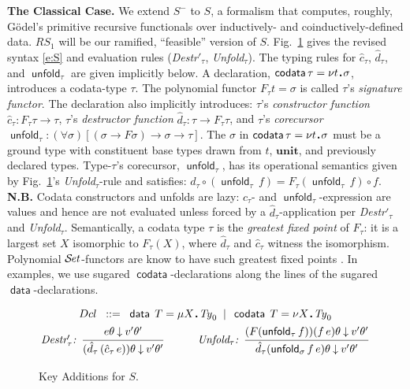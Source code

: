 \documentclass[envcountsame]{llncs}
\newcommand{\co}[1]{\hat{#1}}
\newcommand{\key}[1]{\ensuremath{\mathop{\mathsf{#1}}\nolimits}\xspace}
\newcommand{\unfold}{\key{unfold}}
\newcommand{\Unit}{\ensuremath{\mathbf{unit}}\xspace}
\newcommand{\Ty}{\mathit{Ty}}
\newcommand{\constr}[1]{\ensuremath{\mathop{\mathsf{#1}}\nolimits}\xspace}
\newcommand{\data}{\constr{data}}
\newcommand{\codata}{\constr{codata}}
\newcommand{\lfp}[1]{\mu #1\,\sqdot\,}
\newcommand{\gfp}[1]{\nu #1\,\sqdot\,}
\newcommand{\SetCat}{\ensuremath{\mathcal{S}\mkern-2.5mu\mathit{et}}\xspace}
\newcommand{\RSi}{\mathit{RS_1}}
\newcommand{\sqdot}{\rule{0.5mm}{0.5mm}}
\newcommand{\is}{\ensuremath{\mathrel{\mathrel{:}\mathrel{:}=}}}
\newcommand{\synsep}{\;\;|\;\;}
\newcommand{\yields}{\mathbin{\downarrow}}
\newcommand{\of}{\colon}
\renewcommand{\colon}{\mathpunct{:}}
\newcommand{\Quad}[1]{\hspace*{#1em}}
\newcommand{\irule}[2]{\ensuremath{{\frac{\strut\textstyle #1}{\strut\textstyle #2}}}}
\newcommand{\rulelabel}[1]{\hbox{\it #1:}\Quad{0.5}}
\begin{document}
\textbf{The Classical Case.} \enspace We extend $S^-$ to $S$, a
formalism that computes, roughly, G\"{o}del's primitive recursive
functionals over inductively- and coinductively-defined data.
$\RSi$ will be our ramified, ``feasible'' version of $S$.
Fig.~\ref{fig:S} gives the revised syntax \eqref{e:S} and evaluation
rules (\emph{Destr}$'_\tau$, \emph{Unfold$_\tau$}).  The typing
rules for $\co{c}_\tau$, $\co{d}_\tau$, and $\unfold_\tau$ are given
implicitly below.  A declaration, $\codata\tau=\gfp{t}\sigma$,
introduces a codata-type $\tau$.  The polynomial functor $F_\tau t =
\sigma$ is called $\tau$'s \emph{signature functor}.  The
declaration also implicitly introduces:
$\tau$'s \emph{constructor function} 
        $\co{c}_\tau\of F_\tau\tau\to\tau$,  
$\tau$'s \emph{destructor  function}  
        $\co{d}_\tau\of \tau \to F_\tau \tau$,
        and
$\tau$'s \emph{corecursor} $\unfold_\tau \of (\forall
        \sigma)[(\sigma \to F\sigma) \to \sigma \to \tau]$.
The $\sigma$ in 
$\codata\tau= \gfp{t}\sigma$ must be a ground type with constituent
base types drawn from $t$, $\Unit$, and previously declared types.
Type-$\tau$'s corecursor, $\unfold_\tau$, has its operational
semantics given by Fig.~\ref{fig:S}'s \emph{Unfold}$_\tau$-rule and
satisfies:
$\co{d}_\tau\circ (\unfold_\tau\,f) = F_\tau (\unfold_\tau\,f)\circ f$.
\textbf{N.B.} Codata constructors and unfolds are lazy:
$\co{c}_\tau$- and $\unfold_\tau$-expression are values and hence 
are not evaluated unless forced by a $\co{d}_\tau$-application 
per \emph{Destr}$'_\tau$ and \emph{Unfold$_\tau$}.
Semantically, a codata type $\tau$ is the \emph{greatest fixed point} 
of $F_\tau$: it is a largest set $X$ isomorphic 
to $F_\tau(X)$, where $\widehat{d}_\tau$ and $\widehat{c}_\tau$
witness the isomorphism.  
Polynomial $\SetCat$-functors are know to have 
such greatest fixed points \cite[Theorem~10.1]{rutten:coalg}. 
In examples, we use sugared 
$\codata$-declarations along the lines of the sugared
$\data$-declarations.   


\begin{figure}[t]
\begin{minipage}{\textwidth}\small
\begin{gather}
\label{e:S}
Dcl \;\;\is\;\; \data\; T = \lfp{X}\Ty_0
  \synsep \codata\; T = \gfp{X}\Ty_0
\\[0ex]
\notag
  \rulelabel{Destr$'_\tau$}
  \irule{e\theta \yields v'\theta'}{(\co{d}_{\tau}\,(\co{c}_{\tau}\,e))\theta \yields 
  v'\theta'} 
  \Quad3
  \rulelabel{Unfold$_\tau$}
  \irule{(F(\unfold_\tau f))(f \, e)\theta\yields v'\theta'}{\co{d}_{\tau}(\unfold_\sigma f\,e)\theta \yields v'\theta'}
\end{gather}
\caption{Key Additions for $S$.}
\label{fig:S}
\end{minipage}
\end{figure}
\end{document}
